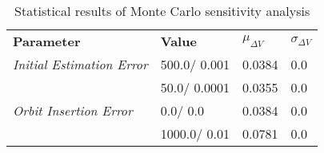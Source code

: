 
                    \begin{table}[]
                    \centering
                    \begin{tabular}{l l l l}
                    \rowcolor[HTML]{EFEFEF} \textbf{Parameter} & \textbf{Value} & \textbf{$\mu_{\Delta V}$} & \textbf{$\sigma_{\Delta V}$} \\
                    \textit{Initial Estimation Error} & 500.0/
0.001 & 0.0384 & 0.0 \\
 & 50.0/
0.0001 & 0.0355 & 0.0 \\
\textit{Orbit Insertion Error} & 0.0/
0.0 & 0.0384 & 0.0 \\
 & 1000.0/
0.01 & 0.0781 & 0.0 \\

                    \end{tabular}
                    \caption{Statistical results of Monte Carlo sensitivity analysis}
                    \label{tab:SensitivityAnalysis}
                    \end{table}
                    